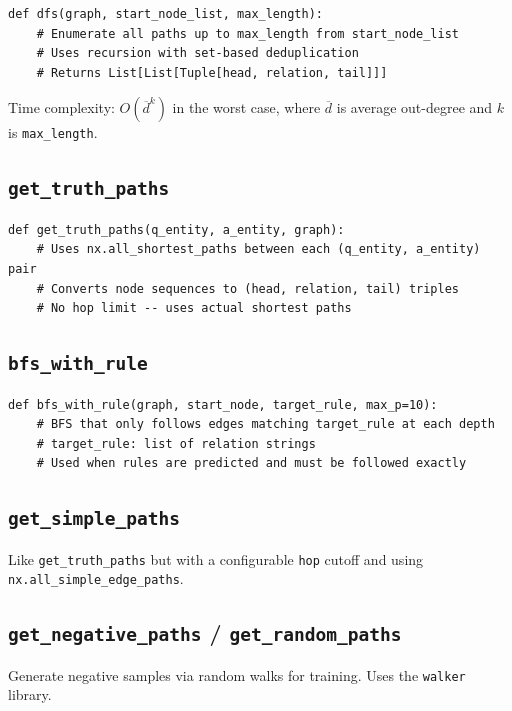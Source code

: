 \documentclass[11pt,a4paper,oneside,openany]{book}
\theoremstyle{definition}
\newcommand{\code}[1]{\texttt{#1}}
\newcommand{\pkg}[1]{\texttt{#1}}
\begin{document}
\begin{lstlisting}
def dfs(graph, start_node_list, max_length):
    # Enumerate all paths up to max_length from start_node_list
    # Uses recursion with set-based deduplication
    # Returns List[List[Tuple[head, relation, tail]]]
\end{lstlisting}

Time complexity: $O(\overline{d}^k)$ in the worst case, where $\overline{d}$ is average out-degree and $k$ is \code{max\_length}.

\subsection{\texttt{get\_truth\_paths}}

\begin{lstlisting}
def get_truth_paths(q_entity, a_entity, graph):
    # Uses nx.all_shortest_paths between each (q_entity, a_entity) pair
    # Converts node sequences to (head, relation, tail) triples
    # No hop limit -- uses actual shortest paths
\end{lstlisting}

\subsection{\texttt{bfs\_with\_rule}}

\begin{lstlisting}
def bfs_with_rule(graph, start_node, target_rule, max_p=10):
    # BFS that only follows edges matching target_rule at each depth
    # target_rule: list of relation strings
    # Used when rules are predicted and must be followed exactly
\end{lstlisting}

\subsection{\texttt{get\_simple\_paths}}

Like \code{get\_truth\_paths} but with a configurable \code{hop} cutoff and using \code{nx.all\_simple\_edge\_paths}.

\subsection{\texttt{get\_negative\_paths} / \texttt{get\_random\_paths}}

Generate negative samples via random walks for training. Uses the \pkg{walker} library.
\end{document}

